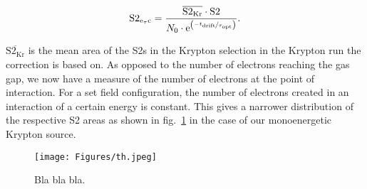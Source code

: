 \begin{equation}
    \mathrm{S2_\mathrm{e_\tau c}} = \frac{ \overline{\mathrm{S2_{Kr}}} \cdot \mathrm{S2} }{ N_0 \cdot \mathrm{e}^{ \left( \nicefrac{-t_\mathrm{drift}}{\tau_\mathrm{opt}} \right)} }.  %
\end{equation}

$ \overline{\mathrm{S2_{Kr}}} $ is the mean area of the S2s in the Krypton selection in the Krypton run the correction is based on.
As opposed to the number of electrons reaching the gas gap, we now have a measure of the number of electrons at the point of interaction.
For a set field configuration, the number of electrons created in an interaction of a certain energy is constant.
This gives a narrower distribution of the respective S2 areas as shown in fig.~\ref{fig:s2-area-hist-after-eltc} in the case of our monoenergetic Krypton source.


\begin{figure}
    \centering
    \texttt{[image: Figures/th.jpeg]}  %
    \caption[S2 area e-lifetime corrected]{
        Bla bla bla.
    }
    \label{fig:s2-area-hist-after-eltc}
\end{figure}


